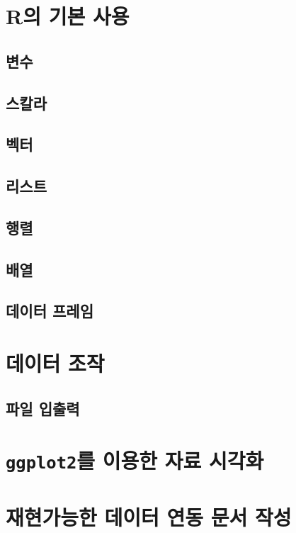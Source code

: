 \documentclass[12pt,a4paper]{book}
\theoremstyle{definition}
\theoremstyle{definition}
\theoremstyle{definition}
\theoremstyle{remark}
\begin{document}
\chapter{R의 기본 사용}\label{r--}

\section{변수}

\section{스칼라}

\section{벡터}

\section{리스트}

\section{행렬}

\section{배열}

\section{데이터 프레임}\label{-}

\chapter{데이터 조작}\label{-}

\section{파일 입출력}\label{-}

\chapter{\texorpdfstring{\texttt{ggplot2}를 이용한 자료
시각화}{ggplot2를 이용한 자료 시각화}}\label{ggplot2---}

\chapter{재현가능한 데이터 연동 문서 작성}\label{----}

\renewcommand\bibname{References}

\end{document}
